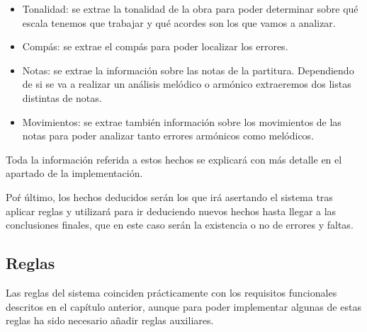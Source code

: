 \begin{itemize}

	\item Tonalidad: se extrae la tonalidad de la obra para poder determinar sobre qué escala tenemos que trabajar y qué acordes son los que vamos a analizar.

	\item Compás: se extrae el compás para poder localizar los errores.

	\item Notas: se extrae la información sobre las notas de la partitura. Dependiendo de si se va a realizar un análisis melódico o armónico extraeremos dos listas distintas de notas.

	\item Movimientos: se extrae también información sobre los movimientos de las notas para poder analizar tanto errores armónicos como melódicos.

\end{itemize}

\bigskip

Toda la información referida a estos hechos se explicará con más detalle en el apartado de la implementación.

\bigskip

Poŕ último, los hechos deducidos serán los que irá asertando el sistema tras aplicar reglas y utilizará para ir deduciendo nuevos hechos hasta llegar a las conclusiones finales, que en este caso serán la existencia o no de errores y faltas.

\subsection{Reglas}

Las reglas del sistema coinciden prácticamente con los requisitos funcionales descritos en el capítulo anterior, aunque para poder implementar algunas de estas reglas ha sido necesario añadir reglas auxiliares.

